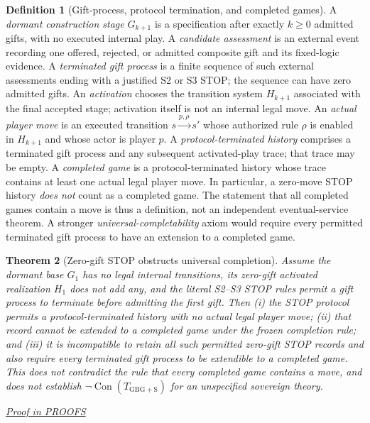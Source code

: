 \documentclass[11pt,letterpaper]{article}
\newtheorem{theorem}{Theorem}[section]
\theoremstyle{definition}\newtheorem{definition}[theorem]{Definition}\newtheorem{example}[theorem]{Example}
\theoremstyle{remark}\newtheorem{remark}[theorem]{Remark}
\newcommand{\Con}{\operatorname{Con}}
\newcommand{\prooflink}[1]{\par\noindent\hfill\small\hyperref[#1]{\textit{Proof in PROOFS}}\normalsize}
\begin{document}
\begin{definition}[Gift-process, protocol termination, and completed games]\label{br:def:lifecycle}
A \emph{dormant construction stage} $G_{k+1}$ is a specification after exactly
$k\ge0$ admitted gifts, with no executed internal play. A \emph{candidate
assessment} is an external event recording one offered, rejected, or admitted
composite gift and its fixed-logic evidence. A \emph{terminated gift process}
is a finite sequence of such external assessments ending with a justified S2
or S3 STOP; the sequence can have zero admitted gifts. An \emph{activation}
chooses the transition system $H_{k+1}$ associated with the final accepted
stage; activation itself is not an internal legal move. An \emph{actual player
move} is an executed transition $s\xrightarrow{p,\rho}s'$ whose authorized
rule $\rho$ is enabled in $H_{k+1}$ and whose actor is player $p$. A
\emph{protocol-terminated history} comprises a terminated gift process and
any subsequent activated-play trace; that trace may be empty. A \emph{completed
game} is a protocol-terminated history whose trace contains at least one
actual legal player move. In particular, a zero-move STOP history \emph{does
not} count as a completed game. The statement that all completed games
contain a move is thus a definition, not an independent eventual-service
theorem. A stronger \emph{universal-completability} axiom would require every
permitted terminated gift process to have an extension to a completed game.
\end{definition}

\begin{theorem}[Zero-gift STOP obstructs universal completion]\label{br:th:stop-liveness}
Assume the dormant base $G_1$ has no legal internal transitions, its zero-gift
activated realization $H_1$ does not add any, and the literal S2--S3 STOP
rules permit a gift process to terminate before admitting the first gift.
Then (i) the STOP protocol permits a protocol-terminated history with no
actual legal player move; (ii) that record cannot be extended to a completed
game under the frozen completion rule; and (iii) it is incompatible to retain
\emph{all} such permitted zero-gift STOP records and also require
\emph{every} terminated gift process to be extendible to a completed game.
This does \emph{not} contradict the rule that every completed game contains
a move, and does not establish $\neg\Con(T_{\mathrm{GBG+S}})$ for an
unspecified sovereign theory.
\prooflink{br:pr:stop-liveness}
\end{theorem}
\end{document}

